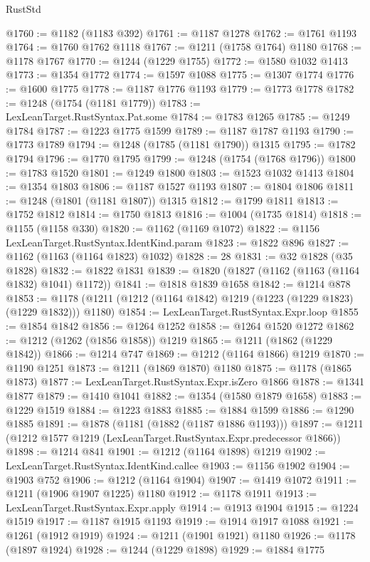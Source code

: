 \begin{lexlean}{RustStd}
\begin{coremodule}
{\begin{coremodule}
{{{{{{{{{{{{{{{{{{{{{{{{{{{{{{{{@1760 := @1182 (@1183 @392)
@1761 := @1187 @1278
@1762 := @1761 @1193
@1764 := @1760 @1762 @1118
@1767 := @1211 (@1758 @1764) @1180
@1768 := @1178 @1767
@1770 := @1244 (@1229 @1755)
@1772 := @1580 @1032 @1413
@1773 := @1354 @1772
@1774 := @1597 @1088
@1775 := @1307 @1774
@1776 := @1600 @1775
@1778 := @1187 @1776 @1193
@1779 := @1773 @1778
@1782 := @1248 (@1754 (@1181 @1779))
@1783 := LexLeanTarget.RustSyntax.Pat.some
@1784 := @1783 @1265
@1785 := @1249 @1784
@1787 := @1223 @1775 @1599
@1789 := @1187 @1787 @1193
@1790 := @1773 @1789
@1794 := @1248 (@1785 (@1181 @1790)) @1315
@1795 := @1782 @1794
@1796 := @1770 @1795
@1799 := @1248 (@1754 (@1768 @1796))
@1800 := @1783 @1520
@1801 := @1249 @1800
@1803 := @1523 @1032 @1413
@1804 := @1354 @1803
@1806 := @1187 @1527 @1193
@1807 := @1804 @1806
@1811 := @1248 (@1801 (@1181 @1807)) @1315
@1812 := @1799 @1811
@1813 := @1752 @1812
@1814 := @1750 @1813
@1816 := @1004 (@1735 @1814)
@1818 := @1155 (@1158 @330)
@1820 := @1162 (@1169 @1072)
@1822 := @1156 LexLeanTarget.RustSyntax.IdentKind.param
@1823 := @1822 @896
@1827 := @1162 (@1163 (@1164 @1823) @1032)
@1828 := 28
@1831 := @32 @1828 (@35 @1828)
@1832 := @1822 @1831
@1839 := @1820 (@1827 (@1162 (@1163 (@1164 @1832) @1041) @1172))
@1841 := @1818 @1839 @1658
@1842 := @1214 @878
@1853 := @1178 (@1211 (@1212 (@1164 @1842) @1219 (@1223 (@1229 @1823) (@1229 @1832))) @1180)
@1854 := LexLeanTarget.RustSyntax.Expr.loop
@1855 := @1854 @1842
@1856 := @1264 @1252
@1858 := @1264 @1520 @1272
@1862 := @1212 (@1262 (@1856 @1858)) @1219
@1865 := @1211 (@1862 (@1229 @1842))
@1866 := @1214 @747
@1869 := @1212 (@1164 @1866) @1219
@1870 := @1190 @1251
@1873 := @1211 (@1869 @1870) @1180
@1875 := @1178 (@1865 @1873)
@1877 := LexLeanTarget.RustSyntax.Expr.isZero @1866
@1878 := @1341 @1877
@1879 := @1410 @1041
@1882 := @1354 (@1580 @1879 @1658)
@1883 := @1229 @1519
@1884 := @1223 @1883
@1885 := @1884 @1599
@1886 := @1290 @1885
@1891 := @1878 (@1181 (@1882 (@1187 @1886 @1193)))
@1897 := @1211 (@1212 @1577 @1219 (LexLeanTarget.RustSyntax.Expr.predecessor @1866))
@1898 := @1214 @841
@1901 := @1212 (@1164 @1898) @1219
@1902 := LexLeanTarget.RustSyntax.IdentKind.callee
@1903 := @1156 @1902
@1904 := @1903 @752
@1906 := @1212 (@1164 @1904)
@1907 := @1419 @1072
@1911 := @1211 (@1906 @1907 @1225) @1180
@1912 := @1178 @1911
@1913 := LexLeanTarget.RustSyntax.Expr.apply
@1914 := @1913 @1904
@1915 := @1224 @1519
@1917 := @1187 @1915 @1193
@1919 := @1914 @1917 @1088
@1921 := @1261 (@1912 @1919)
@1924 := @1211 (@1901 @1921) @1180
@1926 := @1178 (@1897 @1924)
@1928 := @1244 (@1229 @1898)
@1929 := @1884 @1775
}}}}}}}}}}}}}}}}}}}}}}}}}}}}}}}}
\end{coremodule}}
\end{coremodule}
\end{lexlean}
